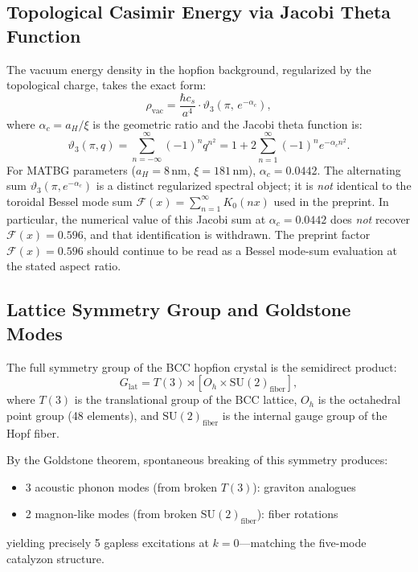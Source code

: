 \documentclass[11pt,letterpaper]{article}
\begin{document}
\subsection{Topological Casimir Energy via Jacobi Theta Function}

The vacuum energy density in the hopfion background, regularized by the topological charge, takes the exact form:
\begin{equation}
\rho_{\text{vac}} = \frac{\hbar c_s}{a^4} \cdot \vartheta_3\!\left(\pi,\, e^{-\alpha_c}\right),
\label{eq:casimir_theta}
\end{equation}
where $\alpha_c = a_H/\xi$ is the geometric ratio and the Jacobi theta function is:
\begin{equation}
\vartheta_3(\pi, q) = \sum_{n=-\infty}^{\infty} (-1)^n q^{n^2} = 1 + 2\sum_{n=1}^{\infty} (-1)^n e^{-\alpha_c n^2}.
\end{equation}
For MATBG parameters ($a_H = 8$\,nm, $\xi = 181$\,nm), $\alpha_c = 0.0442$. The alternating sum $\vartheta_3(\pi, e^{-\alpha_c})$ is a distinct regularized spectral object; it is \emph{not} identical to the toroidal Bessel mode sum $\mathcal{F}(x)=\sum_{n=1}^{\infty}K_0(nx)$ used in the preprint. In particular, the numerical value of this Jacobi sum at $\alpha_c=0.0442$ does \emph{not} recover $\mathcal{F}(x)=0.596$, and that identification is withdrawn. The preprint factor $\mathcal{F}(x)=0.596$ should continue to be read as a Bessel mode-sum evaluation at the stated aspect ratio.

\subsection{Lattice Symmetry Group and Goldstone Modes}

The full symmetry group of the BCC hopfion crystal is the semidirect product:
\begin{equation}
G_{\text{lat}} = T(3) \rtimes \left[O_h \times \text{SU}(2)_{\text{fiber}}\right],
\end{equation}
where $T(3)$ is the translational group of the BCC lattice, $O_h$ is the octahedral point group (48 elements), and $\text{SU}(2)_{\text{fiber}}$ is the internal gauge group of the Hopf fiber.

By the Goldstone theorem, spontaneous breaking of this symmetry produces:
\begin{itemize}[nosep]
    \item 3 acoustic phonon modes (from broken $T(3)$): graviton analogues
    \item 2 magnon-like modes (from broken $\text{SU}(2)_{\text{fiber}}$): fiber rotations
\end{itemize}
yielding precisely 5 gapless excitations at $k = 0$---matching the five-mode catalyzon structure.
\end{document}

